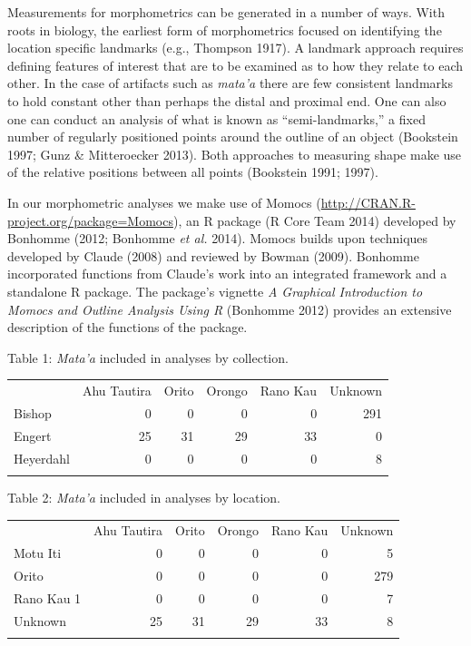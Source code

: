 \documentclass[]{article}
\begin{document}
Measurements for morphometrics can be generated in a number of ways.
With roots in biology, the earliest form of morphometrics focused on
identifying the location specific landmarks (e.g., Thompson 1917). A
landmark approach requires defining features of interest that are to be
examined as to how they relate to each other. In the case of artifacts
such as \emph{mata'a} there are few consistent landmarks to hold
constant other than perhaps the distal and proximal end. One can also
one can conduct an analysis of what is known as ``semi-landmarks,'' a
fixed number of regularly positioned points around the outline of an
object (Bookstein 1997; Gunz \& Mitteroecker 2013). Both approaches to
measuring shape make use of the relative positions between all points
(Bookstein 1991; 1997).

In our morphometric analyses we make use of Momocs
(\url{http://CRAN.R-project.org/package=Momocs}), an R package (R Core
Team 2014) developed by Bonhomme (2012; Bonhomme \emph{et al.} 2014).
Momocs builds upon techniques developed by Claude (2008) and reviewed by
Bowman (2009). Bonhomme incorporated functions from Claude's work into
an integrated framework and a standalone R package. The package's
vignette \emph{A Graphical Introduction to Momocs and Outline Analysis
Using R} (Bonhomme 2012) provides an extensive description of the
functions of the package.

Table 1: \emph{Mata'a} included in analyses by collection.

\begin{longtable}[c]{@{}lrrrrr@{}}
\toprule\addlinespace
& Ahu Tautira & Orito & Orongo & Rano Kau & Unknown
\\\addlinespace
\midrule\endhead
Bishop & 0 & 0 & 0 & 0 & 291
\\\addlinespace
Engert & 25 & 31 & 29 & 33 & 0
\\\addlinespace
Heyerdahl & 0 & 0 & 0 & 0 & 8
\\\addlinespace
\bottomrule
\end{longtable}

Table 2: \emph{Mata'a} included in analyses by location.

\begin{longtable}[c]{@{}lrrrrr@{}}
\toprule\addlinespace
& Ahu Tautira & Orito & Orongo & Rano Kau & Unknown
\\\addlinespace
\midrule\endhead
Motu Iti & 0 & 0 & 0 & 0 & 5
\\\addlinespace
Orito & 0 & 0 & 0 & 0 & 279
\\\addlinespace
Rano Kau 1 & 0 & 0 & 0 & 0 & 7
\\\addlinespace
Unknown & 25 & 31 & 29 & 33 & 8
\\\addlinespace
\bottomrule
\end{longtable}
\end{document}
